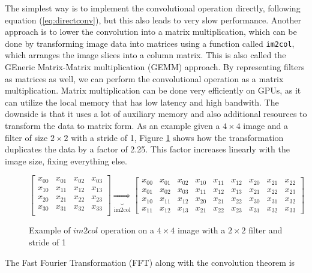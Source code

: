 The simplest way is to implement the convolutional operation directly, following
equation (\ref{eq:directconv}), but this also leads to very slow performance. 
Another approach is to lower the convolution into a matrix multiplication, which
can be done by transforming image data into matrices using a function called
\texttt{im2col}, which arranges the image slices into a column matrix. 
This is also called the GEneric Matrix-Matrix multiplication (GEMM) approach. 
By representing filters as matrices as well, we can perform the convolutional
operation as a matrix multiplication. Matrix multiplication can be done very
efficiently on GPUs, as it can utilize the local memory that has low latency and
high bandwith. 
The downside is that it uses a lot of auxiliary memory and also additional
resources to transform the data to matrix form. 
As an example given a $4 \times 4$ image and a filter of size $2\times 2$ with a
stride of 1, Figure \ref{im2col} shows how the transformation duplicates the
data by a factor of 2.25. This factor increases linearly with the image size,
fixing everything else.  
\begin{figure}[!hbtp]
	\begin{displaymath}
	\begin{bmatrix}
	x_{00} & x_{01} & x_{02} & x_{03} \\ 
	x_{10} & x_{11} & x_{12} & x_{13} \\ 
	x_{20} & x_{21} & x_{22} & x_{23} \\ 
	x_{30} & x_{31} & x_{32} & x_{33}  \\  
	\end{bmatrix}
	\underbrace{\Rightarrow}_{\text{im2col}}
	\begin{bmatrix} 
	x_{00} & x_{01} & x_{02} & x_{10} & x_{11} & x_{12} & x_{20} & x_{21} & x_{22}
	\\ 
	x_{01} & x_{02} & x_{03} & x_{11} & x_{12} & x_{13} & x_{21} & x_{22} & x_{23}
	\\
	x_{10} & x_{11} & x_{12} & x_{20} & x_{21} & x_{22} & x_{30} & x_{31} & x_{32}
	\\ 
	x_{11} & x_{12} & x_{13} & x_{21} & x_{22} & x_{23} & x_{31} & x_{32} & x_{33}
	\end{bmatrix}
	\end{displaymath}
	\caption{Example of $im2col$ operation on a $4\times 4$ image with a $2 \times
		2$ filter and stride of 1}
	\label{im2col}
\end{figure} \newline
The Fast Fourier Transformation (FFT) along with the convolution theorem is
